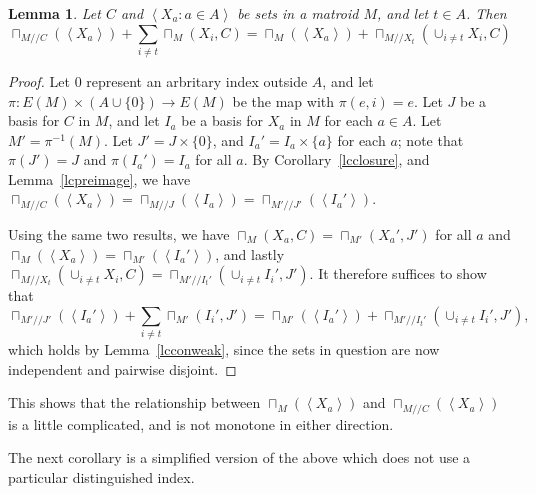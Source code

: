 \documentclass{amsart}
\theoremstyle{plain}
\newtheorem{lemma}[theorem]{Lemma}
\theoremstyle{definition}
\newcommand{\dcon}{/ \!\! /}
\newcommand{\ab}[1]{\left\langle#1\right\rangle}
\begin{document}
\begin{lemma}\label{mcprojindex}
  Let $C$ and $\ab{X_a : a \in A}$ be sets in a matroid $M$, and let $t \in A$. Then 
  \[\sqcap_{M \dcon C}(\ab{X_a}) + \sum_{i \ne t} \sqcap_M(X_i, C) = 
  \sqcap_M(\ab{X_a}) + \sqcap_{M \dcon X_t}(\cup_{i \ne t} X_i, C)\]
\end{lemma}
\begin{proof}
  Let $0$ represent an arbritary index outside $A$, and let $\pi : E(M) \times (A \cup \{0\}) \to E(M)$ be the map with $\pi(e,i) = e$.
  Let $J$ be a basis for $C$ in $M$, and let $I_a$ be a basis for $X_a$ in $M$ for each $a \in A$. Let $M' = \pi^{-1}(M)$. 
  Let $J' = J \times \{0\}$, and $I_a' = I_a \times \{a\}$ for each $a$; note that $\pi(J') = J$ and $\pi(I_a') = I_a$ for all $a$. 
  By Corollary~\ref{lcclosure}, and Lemma~\ref{lcpreimage}, we have 
  $\sqcap_{M \dcon C}(\ab{X_a}) = \sqcap_{M \dcon J}(\ab{I_a}) = \sqcap_{M' \dcon J'}(\ab{I_a'})$. 

  Using the same two results,
  we have $\sqcap_M(X_a, C) = \sqcap_{M'}(X_a', J')$ for all $a$ and $\sqcap_M(\ab{X_a}) = \sqcap_{M'}(\ab{I_a'})$, and 
  lastly $\sqcap_{M \dcon X_t}(\cup_{i \ne t}X_i, C) = \sqcap_{M' \dcon I_t'}(\cup_{i \ne t}I_i', J')$. It therefore
  suffices to show that 
  \[\sqcap_{M' \dcon J'}(\ab{I_a'}) + \sum_{i \ne t} \sqcap_{M'}(I_i', J') = 
  \sqcap_{M'}(\ab{I_a'}) + \sqcap_{M' \dcon I_t'}(\cup_{i \ne t} I_i', J'),\]
  which holds by Lemma~\ref{lcconweak}, since the sets in question are now independent and pairwise disjoint. 
\end{proof}

This shows that the relationship between $\sqcap_M(\ab{X_a})$ and $\sqcap_{M \dcon C}(\ab{X_a})$ 
is a little complicated, and is not monotone in either direction. 

The next corollary is a simplified version of the above which does not use a particular distinguished index. 
\end{document}
